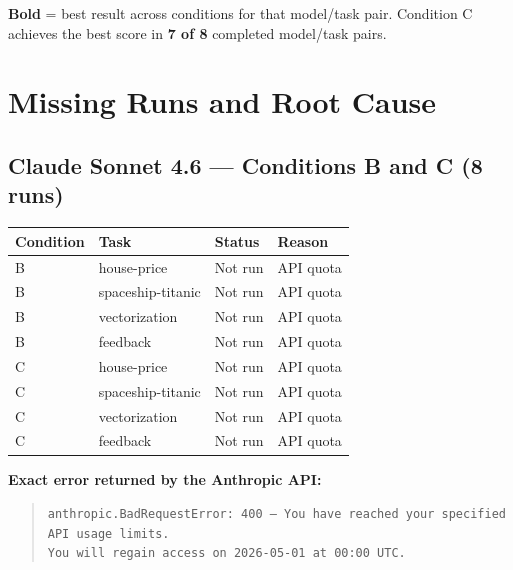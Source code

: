 \documentclass[11pt,a4paper]{article}
\begin{document}
\vspace{0.4em}
\textbf{Bold} = best result across conditions for that model/task pair.
Condition C achieves the best score in \textbf{7 of 8} completed model/task pairs.

\section{Missing Runs and Root Cause}
\label{sec:missing}

\subsection*{Claude Sonnet 4.6 --- Conditions B and C (8 runs)}

\begin{center}
\begin{tabular}{llll}
\toprule
\textbf{Condition} & \textbf{Task} & \textbf{Status} & \textbf{Reason} \\
\midrule
B & house-price       & \cellcolor{missingyellow}Not run & API quota \\
B & spaceship-titanic & \cellcolor{missingyellow}Not run & API quota \\
B & vectorization     & \cellcolor{missingyellow}Not run & API quota \\
B & feedback          & \cellcolor{missingyellow}Not run & API quota \\
C & house-price       & \cellcolor{missingyellow}Not run & API quota \\
C & spaceship-titanic & \cellcolor{missingyellow}Not run & API quota \\
C & vectorization     & \cellcolor{missingyellow}Not run & API quota \\
C & feedback          & \cellcolor{missingyellow}Not run & API quota \\
\bottomrule
\end{tabular}
\end{center}

\vspace{0.3em}
\textbf{Exact error returned by the Anthropic API:}
\begin{quote}
\texttt{anthropic.BadRequestError: 400 --- You have reached your specified API usage limits.\\
You will regain access on 2026-05-01 at 00:00 UTC.}
\end{quote}
\end{document}
